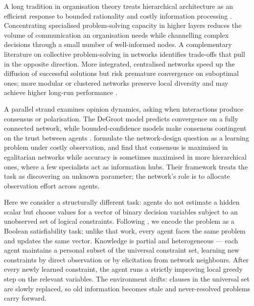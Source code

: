 \documentclass{article}
\begin{document}
A long tradition in organisation theory treats hierarchical architecture as an efficient response to bounded rationality and costly information processing \parencite{simon1962architecture, radner1993organization, bolton1994firm}. Concentrating specialised problem-solving capacity in higher layers reduces the volume of communication an organisation needs while channelling complex decisions through a small number of well-informed nodes. A complementary literature on collective problem-solving in networks identifies trade-offs that pull in the opposite direction. More integrated, centralised networks speed up the diffusion of successful solutions but risk premature convergence on suboptimal ones; more modular or clustered networks preserve local diversity and may achieve higher long-run performance \parencite{lazer2007network, mason2008propagation, fang2010balancing, shore2015facts, barkoczi2016social}.

A parallel strand examines opinion dynamics, asking when interactions produce consensus or polarisation. The DeGroot model predicts convergence on a fully connected network, while bounded-confidence models make consensus contingent on the trust between agents \parencite{noorazar2020classical}. \textcite{berekmeri2020optimal} formulate the network-design question as a learning problem under costly observation, and find that consensus is maximised in egalitarian networks while accuracy is sometimes maximised in more hierarchical ones, where a few specialists act as information hubs. Their framework treats the task as discovering an unknown parameter; the network's role is to allocate observation effort across agents.

Here we consider a structurally different task: agents do not estimate a hidden scalar but choose values for a vector of binary decision variables subject to an unobserved set of logical constraints. Following \textcite{hebert2025governance}, we encode the problem as a Boolean satisfiability task; unlike that work, every agent faces the same problem and updates the same vector. Knowledge is partial and heterogeneous --- each agent maintains a personal subset of the universal constraint set, learning new constraints by direct observation or by elicitation from network neighbours. After every newly learned constraint, the agent runs a strictly improving local greedy step on the relevant variables. The environment drifts: clauses in the universal set are slowly replaced, so old information becomes stale and never-resolved problems carry forward.
\end{document}
